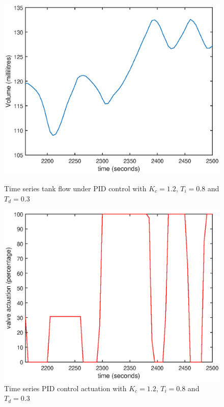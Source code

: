 \documentclass{article}
\begin{document}
\begin{figure}[h]
	\centering
	\begin{minipage}{0.45\textwidth}
		\centering
		\includegraphics[scale=0.4]{PID_Kc_12_Ti_08_Td_03}
		\caption{Time series tank flow under PID control with $K_c = 1.2$, $T_i = 0.8$ and $T_d = 0.3$}
	\end{minipage}
	\hspace{0.5cm}
	\begin{minipage}{0.45\textwidth}
		\centering
		\includegraphics[scale=0.4]{PID_Kc_12_Ti_08_Td_03_control}
		\caption{Time series PID control actuation with $K_c = 1.2$, $T_i = 0.8$ and $T_d = 0.3$}
	\end{minipage}
\end{figure}
\end{document}

